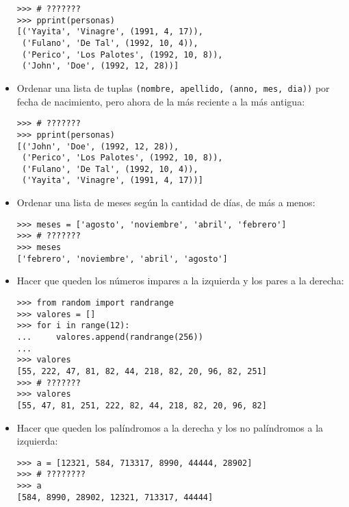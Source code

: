 \begin{itemize}
\begin{lstlisting}
>>> # ???????
>>> pprint(personas)
[('Yayita', 'Vinagre', (1991, 4, 17)),
 ('Fulano', 'De Tal', (1992, 10, 4)),
 ('Perico', 'Los Palotes', (1992, 10, 8)),
 ('John', 'Doe', (1992, 12, 28))]
\end{lstlisting}
\item
  Ordenar una lista de tuplas
  \lstinline!(nombre, apellido, (anno, mes, dia))! por fecha de
  nacimiento, pero ahora de la más reciente a la más antigua:

\begin{lstlisting}
>>> # ???????
>>> pprint(personas)
[('John', 'Doe', (1992, 12, 28)),
 ('Perico', 'Los Palotes', (1992, 10, 8)),
 ('Fulano', 'De Tal', (1992, 10, 4)),
 ('Yayita', 'Vinagre', (1991, 4, 17))]
\end{lstlisting}
\item
  Ordenar una lista de meses según la cantidad de días, de más a menos:

\begin{lstlisting}
>>> meses = ['agosto', 'noviembre', 'abril', 'febrero']
>>> # ???????
>>> meses
['febrero', 'noviembre', 'abril', 'agosto']
\end{lstlisting}
\item
  Hacer que queden los números impares a la izquierda y los pares a la
  derecha:

\begin{lstlisting}
>>> from random import randrange
>>> valores = []
>>> for i in range(12):
...     valores.append(randrange(256))
...
>>> valores
[55, 222, 47, 81, 82, 44, 218, 82, 20, 96, 82, 251]
>>> # ???????
>>> valores
[55, 47, 81, 251, 222, 82, 44, 218, 82, 20, 96, 82]
\end{lstlisting}
\item
  Hacer que queden los palíndromos a la derecha y los no palíndromos a
  la izquierda:

\begin{lstlisting}
>>> a = [12321, 584, 713317, 8990, 44444, 28902]
>>> # ????????
>>> a
[584, 8990, 28902, 12321, 713317, 44444]
\end{lstlisting}
\end{itemize}
